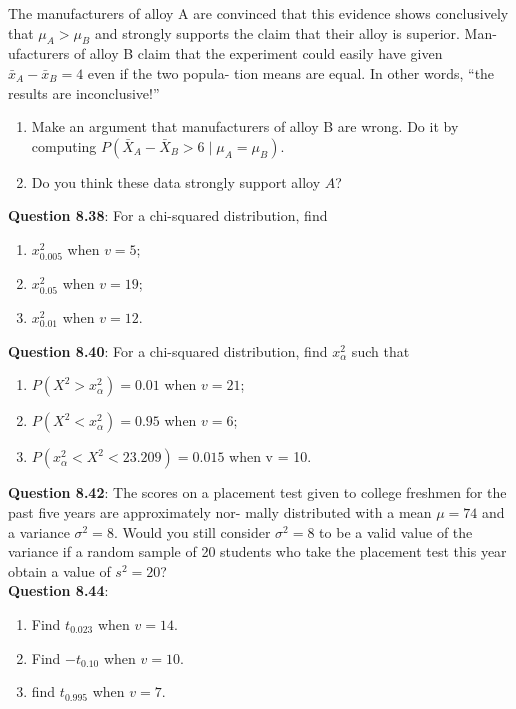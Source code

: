 \documentclass{article}
\begin{document}
    The manufacturers of alloy A are convinced that this
    evidence shows conclusively that $\mu_A > \mu_B$ and strongly
    supports the claim that their alloy is superior. Man-
    ufacturers of alloy B claim that the experiment could
    easily have given $\bar{x}_A - \bar{x}_B = 4$ even if the two popula-
    tion means are equal. In other words, “the results are
    inconclusive!”
    \begin{enumerate}[label = (\alph*) ]
        \item Make an argument that manufacturers of alloy B
        are wrong. Do it by computing $P(\bar{X}_A-\bar{X}_B>6 \mid \mu_A = \mu_B)$.
        \item Do you think these data strongly support alloy $A$?
    \end{enumerate}
    \textbf{Question 8.38}: For a chi-squared distribution, find
        \begin{enumerate}[label = (\alph*) ]
            \item $x_{0.005}^{2}$ when $v = 5$;
            \item $x_{0.05}^{2}$ when $v = 19$;
            \item $x_{0.01}^{2}$ when $v = 12$.
        \end{enumerate}
    \textbf{Question 8.40}: For a chi-squared distribution, find $x^{2}_{\alpha}$ such that
        \begin{enumerate}[label = (\alph*) ]
            \item $P(X^2 > x^{2}_{\alpha}) = 0.01$ when $v = 21$;
            \item $P(X^2 < x^{2}_{\alpha}) = 0.95$ when $v = 6$;
            \item $P(x^{2}_{\alpha} < X^2 < 23.209) = 0.015$ when v = 10.
        \end{enumerate}
    \textbf{Question 8.42}: The scores on a placement test given to college
    freshmen for the past five years are approximately nor-
    mally distributed with a mean $\mu = 74$ and a variance
    $\sigma^2 = 8$. Would you still consider $\sigma^2 = 8$ to be a valid
    value of the variance if a random sample of 20 students
    who take the placement test this year obtain a value of
    $s^2 = 20$?\\\newline
    \textbf{Question 8.44}:
        \begin{enumerate}[label = (\alph*) ]
            \item Find $t_{0.023}$ when $v = 14$.
            \item Find $-t_{0.10}$ when $v = 10$.
            \item find $t_0.995$ when $v = 7$.
        \end{enumerate}
\end{document}
